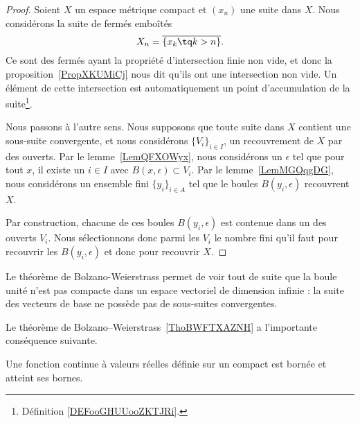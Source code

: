 \begin{proof}
   Soient \( X\) un espace métrique compact et \( (x_n)\) une suite dans \( X\). Nous considérons la suite de fermés emboîtés
   \begin{equation}
       X_n=\overline{ \{ x_k\tq k>n \} }.
   \end{equation}
   Ce sont des fermés ayant la propriété d'intersection finie non vide, et donc la proposition~\ref{PropXKUMiCj} nous dit qu'ils ont une intersection non vide. Un élément de cette intersection est automatiquement un point d'accumulation de la suite\footnote{Définition \ref{DEFooGHUUooZKTJRi}.}.

   Nous passons à l'autre sens. Nous supposons que toute suite dans \( X\) contient une sous-suite convergente, et nous considérons \( \{ V_i \}_{i\in I}\), un recouvrement de \( X\) par des ouverts. Par le lemme~\ref{LemQFXOWyx}, nous considérons un \( \epsilon\) tel que pour tout \( x\), il existe un \( i\in I\) avec \( B(x,\epsilon)\subset V_i\). Par le lemme~\ref{LemMGQqgDG}, nous considérons un ensemble fini \( \{ y_i \}_{i\in A}\) tel que le boules \( B(y_i,\epsilon)\) recouvrent \( X\).

   Par construction, chacune de ces boules \( B(y_i,\epsilon)\) est contenue dans un des ouverts \( V_i\). Nous sélectionnons donc parmi les \( V_i\) le nombre fini qu'il faut pour recouvrir les \( B(y_i,\epsilon)\) et donc pour recouvrir \( X\).
\end{proof}

\begin{example}\label{ExEFYooTILPDk}
    Le théorème de Bolzano-Weierstrass permet de voir tout de suite que la boule unité n'est pas compacte dans un espace vectoriel de dimension infinie : la suite des vecteurs de base ne possède pas de sous-suites convergentes.
\end{example}


Le théorème de Bolzano–Weierstrass~\ref{ThoBWFTXAZNH} a l'importante conséquence suivante.
\begin{theorem}[Weierstrass]		\label{ThoWeirstrassRn}
	Une fonction continue à valeurs réelles définie sur un compact est bornée et atteint ses bornes.
\end{theorem}

